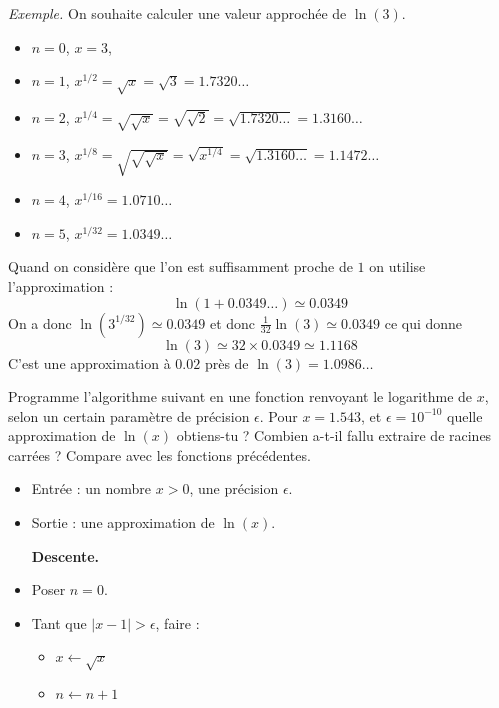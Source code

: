 \documentclass[11pt,class=report,crop=false]{standalone}
\begin{document}
\begin{activite}
\begin{enumerate}
     \emph{Exemple.} On souhaite calculer une valeur approchée de $\ln(3)$.
     \begin{itemize}
       \item $n=0$, $x = 3$, 
       \item $n=1$, $x^{1/2} = \sqrt{x} = \sqrt{3} = 1.7320\ldots$
       \item $n=2$, $x^{1/4} = \sqrt{\sqrt{x}} = \sqrt{\sqrt2} = \sqrt{1.7320\ldots} = 1.3160\ldots$
       \item $n=3$, $x^{1/8} = \sqrt{\sqrt{\sqrt{x}}} = \sqrt{x^{1/4}} = \sqrt{1.3160\ldots} = 1.1472\ldots$
       \item $n=4$, $x^{1/16} = 1.0710\ldots$
       \item $n=5$, $x^{1/32} = 1.0349\ldots$
     \end{itemize}
     Quand on considère que l'on est suffisamment proche de $1$ on utilise l'approximation :
     $$\ln(1 + 0.0349\ldots) \simeq 0.0349$$ 
    On a donc $\ln\left(3^{1/32}\right) \simeq 0.0349$ et donc
    $\frac{1}{32}\ln(3) \simeq 0.0349$ ce qui donne
    $$\ln(3) \simeq 32 \times 0.0349 \simeq 1.1168$$
    C'est une approximation à $0.02$ près de $\ln(3) = 1.0986\ldots$
    
    Programme l'algorithme suivant en une fonction  renvoyant le logarithme de $x$, selon un certain paramètre de précision $\epsilon$.
    Pour $x = 1.543$, et $\epsilon = 10^{-10}$ quelle approximation de $\ln(x)$ obtiens-tu ? Combien a-t-il fallu extraire de racines carrées ? Compare avec les fonctions précédentes.
    
         \begin{algorithme}
  \sauteligne 
 \begin{itemize}
   \item Entrée : un nombre $x>0$, une précision $\epsilon$.
   
   \item Sortie : une approximation de $\ln(x)$. 
  
  \textbf{Descente.}
  
  \item Poser $n=0$.
  
  \item Tant que $|x-1|>\epsilon$, faire :
  \begin{itemize}
    \item $x \leftarrow \sqrt{x}$
    
    \item $n \leftarrow n +1$
    

\end{itemize}
\end{itemize}
\end{algorithme}
\end{enumerate}
\end{activite}
\end{document}
